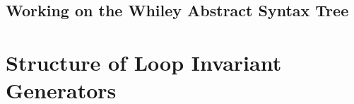 \subsection{Working on the Whiley Abstract Syntax Tree}

\section{Structure of Loop Invariant Generators}
